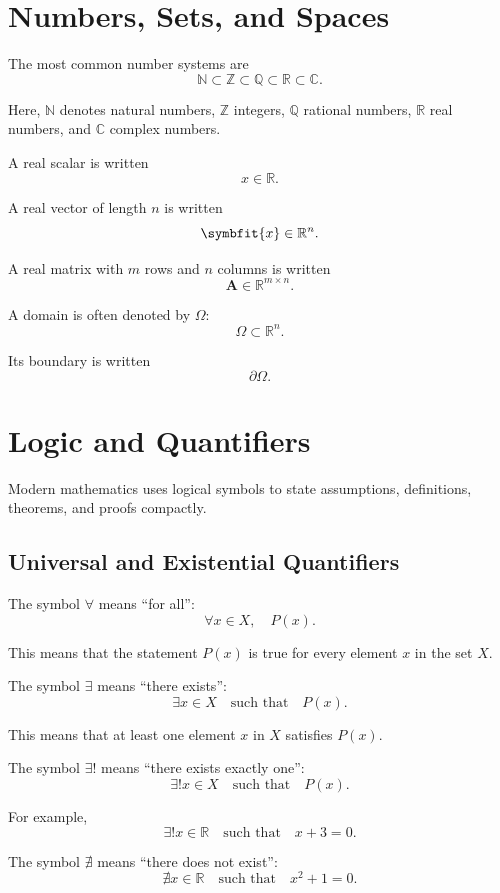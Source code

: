 \documentclass[11pt,twocolumn]{article}
\newcommand{\N}{\mathbb{N}}
\newcommand{\Z}{\mathbb{Z}}
\newcommand{\Q}{\mathbb{Q}}
\newcommand{\R}{\mathbb{R}}
\newcommand{\C}{\mathbb{C}}
\newcommand{\vct}[1]{\symbfit{#1}}   %
\newcommand{\mat}[1]{\symbf{#1}}     %
\begin{document}
\section{Numbers, Sets, and Spaces}

The most common number systems are
\[
\N \subset \Z \subset \Q \subset \R \subset \C.
\]

Here,
\(\N\) denotes natural numbers,
\(\Z\) integers,
\(\Q\) rational numbers,
\(\R\) real numbers,
and \(\C\) complex numbers.

A real scalar is written
\[
x \in \R.
\]

A real vector of length \(n\) is written
\[
\vct{x} \in \R^n.
\]

A real matrix with \(m\) rows and \(n\) columns is written
\[
\mat{A} \in \R^{m \times n}.
\]

A domain is often denoted by \(\Omega\):
\[
\Omega \subset \R^n.
\]

Its boundary is written
\[
\partial \Omega.
\]

\section{Logic and Quantifiers}

Modern mathematics uses logical symbols to state assumptions, definitions,
theorems, and proofs compactly.

\subsection{Universal and Existential Quantifiers}

The symbol \(\forall\) means ``for all'':
\[
\forall x \in X,\quad P(x).
\]

This means that the statement \(P(x)\) is true for every element \(x\)
in the set \(X\).

The symbol \(\exists\) means ``there exists'':
\[
\exists x \in X
\quad
\text{such that}
\quad
P(x).
\]

This means that at least one element \(x\) in \(X\) satisfies \(P(x)\).

The symbol \(\exists!\) means ``there exists exactly one'':
\[
\exists! x \in X
\quad
\text{such that}
\quad
P(x).
\]

For example,
\[
\exists! x \in \R
\quad
\text{such that}
\quad
x+3=0.
\]

The symbol \(\nexists\) means ``there does not exist'':
\[
\nexists x \in \R
\quad
\text{such that}
\quad
x^2+1=0.
\]
\end{document}
